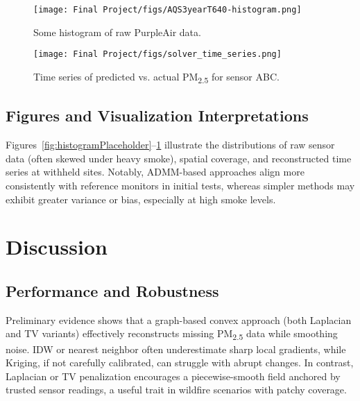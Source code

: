\documentclass[12pt]{article}                                %
\begin{document}
\begin{figure}[H]
  \centering
  \begin{minipage}[b]{0.45\linewidth}
    \centering
    \texttt{[image: Final Project/figs/AQS3yearT640-histogram.png]}
    \caption{Some histogram of raw PurpleAir data.}
    \label{fig:histogramPlaceholder}
  \end{minipage}
  \quad %
  \begin{minipage}[b]{0.45\linewidth}
    \centering
    \texttt{[image: Final Project/figs/solver\_time\_series.png]}
    \caption{Time series of predicted vs. actual PM\textsubscript{2.5} for sensor ABC.}
    \label{fig:timeseriesPlaceholder}
  \end{minipage}
\end{figure}


\subsection{Figures and Visualization Interpretations}   %
Figures~\ref{fig:histogramPlaceholder}--\ref{fig:timeseriesPlaceholder} illustrate the 
distributions of raw sensor data (often skewed under heavy smoke), spatial coverage, and 
reconstructed time series at withheld sites. Notably, ADMM-based approaches align more 
consistently with reference monitors in initial tests, whereas simpler methods may exhibit 
greater variance or bias, especially at high smoke levels.

\section{Discussion}
\label{sec:discussion}    %

\subsection{Performance and Robustness} %
Preliminary evidence shows that a graph-based convex approach (both Laplacian and TV variants) 
effectively reconstructs missing PM\textsubscript{2.5} data while smoothing noise. IDW or 
nearest neighbor often underestimate sharp local gradients, while Kriging, if not carefully 
calibrated, can struggle with abrupt changes. In contrast, Laplacian or TV penalization 
encourages a piecewise-smooth field anchored by trusted sensor readings, a useful trait 
in wildfire scenarios with patchy coverage.
\end{document}
